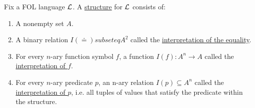 \begin{definition}\label{def:first_order_structure}\cite[definition 4.1]{Nerode2012}
  Fix a FOL language $\mathcal L$. A \ul{structure} for $\mathcal L$ consists of:
  \begin{enumerate}
    \item A nonempty set $A$.
    \item A binary relation $I(\doteq) subseteq A^2$ called the \ul{interpretation of the equality}.
    \item For every $n$-ary function symbol $f$, a function $I(f): A^n \to A$ called the \ul{interpretation of $f$}.
    \item For every $n$-ary predicate $p$, an n-ary relation $I(p) \subseteq A^n$ called the \ul{interpretation of $p$}, i.e. all tuples of values that satisfy the predicate within the structure.
  \end{enumerate}
\end{definition}

